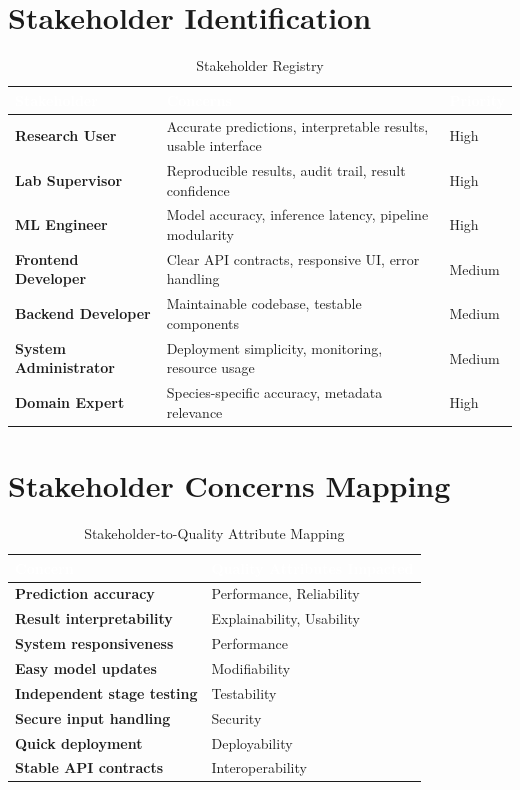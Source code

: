 \documentclass[11pt,a4paper,oneside]{report}
\begin{document}
\section{Stakeholder Identification}

\begin{table}[H]
\centering\footnotesize
\caption{Stakeholder Registry}
\label{tab:stakeholders}
\begin{tabularx}{\textwidth}{>{\bfseries}l X l}
\toprule
\rowcolor{tableheader}
\textcolor{white}{Stakeholder} & \textcolor{white}{Concerns} & \textcolor{white}{Priority} \\
\midrule
Research User       & Accurate predictions, interpretable results, usable interface & High \\
Lab Supervisor      & Reproducible results, audit trail, result confidence & High \\
ML Engineer         & Model accuracy, inference latency, pipeline modularity & High \\
Frontend Developer  & Clear API contracts, responsive UI, error handling & Medium \\
Backend Developer   & Maintainable codebase, testable components & Medium \\
System Administrator & Deployment simplicity, monitoring, resource usage & Medium \\
Domain Expert       & Species-specific accuracy, metadata relevance & High \\
\bottomrule
\end{tabularx}
\end{table}

\section{Stakeholder Concerns Mapping}

\begin{table}[H]
\centering\footnotesize
\caption{Stakeholder-to-Quality Attribute Mapping}
\label{tab:concern-mapping}
\begin{tabularx}{\textwidth}{>{\bfseries}l X}
\toprule
\rowcolor{tableheader}
\textcolor{white}{Concern} & \textcolor{white}{Quality Attributes Impacted} \\
\midrule
Prediction accuracy       & Performance, Reliability \\
Result interpretability   & Explainability, Usability \\
System responsiveness     & Performance \\
Easy model updates        & Modifiability \\
Independent stage testing & Testability \\
Secure input handling     & Security \\
Quick deployment          & Deployability \\
Stable API contracts      & Interoperability \\
\bottomrule
\end{tabularx}
\end{table}
\end{document}
